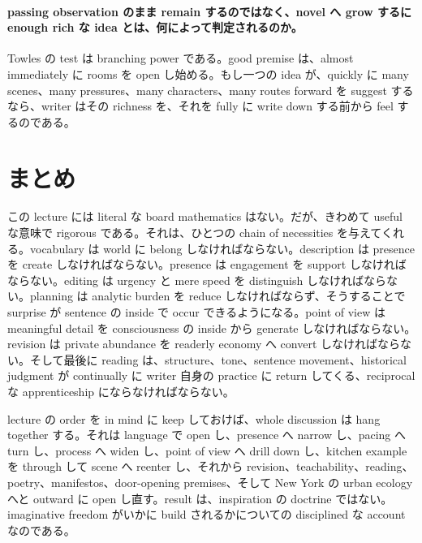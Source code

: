 \paragraph{passing observation のまま remain するのではなく、novel へ grow するに enough rich な idea とは、何によって判定されるのか。}

Towles の test は branching power である。good premise は、almost immediately に rooms を open し始める。もし一つの idea が、quickly に many scenes、many pressures、many characters、many routes forward を suggest するなら、writer はその richness を、それを fully に write down する前から feel するのである。

\section{まとめ}

この lecture には literal な board mathematics はない。だが、きわめて useful な意味で rigorous である。それは、ひとつの chain of necessities を与えてくれる。vocabulary は world に belong しなければならない。description は presence を create しなければならない。presence は engagement を support しなければならない。editing は urgency と mere speed を distinguish しなければならない。planning は analytic burden を reduce しなければならず、そうすることで surprise が sentence の inside で occur できるようになる。point of view は meaningful detail を consciousness の inside から generate しなければならない。revision は private abundance を readerly economy へ convert しなければならない。そして最後に reading は、structure、tone、sentence movement、historical judgment が continually に writer 自身の practice に return してくる、reciprocal な apprenticeship にならなければならない。

lecture の order を in mind に keep しておけば、whole discussion は hang together する。それは language で open し、presence へ narrow し、pacing へ turn し、process へ widen し、point of view へ drill down し、kitchen example を through して scene へ reenter し、それから revision、teachability、reading、poetry、manifestos、door-opening premises、そして New York の urban ecology へと outward に open し直す。result は、inspiration の doctrine ではない。imaginative freedom がいかに build されるかについての disciplined な account なのである。